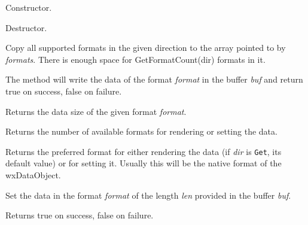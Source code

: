 Constructor.

\label{wxdataobjectdtor}


Destructor.

\label{wxdataobjectgetallformats}


Copy all supported formats in the given direction to the array pointed to by 
{\it formats}. There is enough space for GetFormatCount(dir) formats in it.


\label{wxdataobjectgetdatahere}


The method will write the data of the format {\it format} in the buffer {\it
buf} and return true on success, false on failure.

\label{wxdataobjectgetdatasize}


Returns the data size of the given format {\it format}.

\label{wxdataobjectgetformatcount}


Returns the number of available formats for rendering or setting the data.

\label{wxdataobjectgetpreferredformat}


Returns the preferred format for either rendering the data (if {\it dir} is {\tt Get},
its default value) or for setting it. Usually this will be the
native format of the wxDataObject.

\label{wxdataobjectsetdata}


Set the data in the format {\it format} of the length {\it len} provided in the
buffer {\it buf}.

Returns true on success, false on failure.

